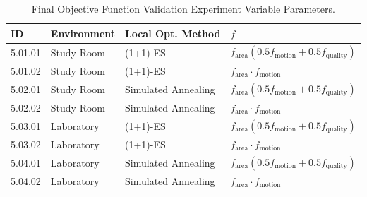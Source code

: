 \begin{table}[ht]
\centering
\caption{Final Objective Function Validation Experiment Variable Parameters.}
\label{tab:final_validation_params}
\begin{tabular}{@{}llll@{}}
\hline
    ID & Environment & Local Opt. Method & $f$ \\
\hline
    5.01.01 & Study Room & (1+1)-ES & $f_{\text{area}}(0.5f_{\text{motion}} + 0.5f_{\text{quality}})$ \\
    5.01.02 & Study Room & (1+1)-ES & $f_{\text{area}} \cdot f_{\text{motion}}$ \\
    \noalign{\smallskip}
    5.02.01 & Study Room & Simulated Annealing & $f_{\text{area}}(0.5f_{\text{motion}} + 0.5f_{\text{quality}})$ \\
    5.02.02 & Study Room & Simulated Annealing & $f_{\text{area}} \cdot f_{\text{motion}}$ \\
    \noalign{\smallskip}
    5.03.01 & Laboratory & (1+1)-ES & $f_{\text{area}}(0.5f_{\text{motion}} + 0.5f_{\text{quality}})$ \\
    5.03.02 & Laboratory & (1+1)-ES & $f_{\text{area}} \cdot f_{\text{motion}}$ \\
    \noalign{\smallskip}
    5.04.01 & Laboratory & Simulated Annealing & $f_{\text{area}}(0.5f_{\text{motion}} + 0.5f_{\text{quality}})$ \\
    5.04.02 & Laboratory & Simulated Annealing & $f_{\text{area}} \cdot f_{\text{motion}}$ \\
\hline
\end{tabular}
\end{table}